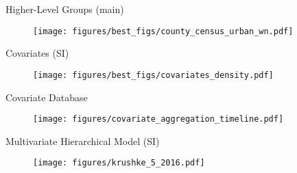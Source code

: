 \documentclass[pdf]{beamer}
\begin{document}

\begin{frame}{Higher-Level Groups (main)}
\begin{figure}[ht]
\begin{center}
\texttt{[image: figures/best\_figs/county\_census\_urban\_wn.pdf]}
\end{center}
\end{figure}
\end{frame}


\begin{frame}{Covariates (SI)}
\begin{figure}[ht]
\begin{center}
\texttt{[image: figures/best\_figs/covariates\_density.pdf]}
\end{center}
\end{figure}
\end{frame}


\begin{frame}{Covariate Database}
\begin{figure}[ht]
\begin{center}
\texttt{[image: figures/covariate\_aggregation\_timeline.pdf]}
\end{center}
\end{figure}
\end{frame}

\begin{frame}{Multivariate Hierarchical Model (SI)}
\begin{figure}[ht]
\begin{center}
\texttt{[image: figures/krushke\_5\_2016.pdf]}
\end{center}
\end{figure}
\end{frame}

\end{document}
